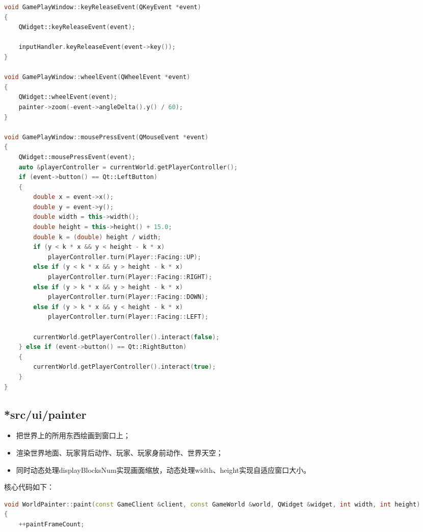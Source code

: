 \documentclass[a4paper,12pt]{report}
\begin{document}
\begin{spacing}{1.5}
\begin{lstlisting}[language={C++}]
void GamePlayWindow::keyReleaseEvent(QKeyEvent *event)
{
    QWidget::keyReleaseEvent(event);

    inputHandler.keyReleaseEvent(event->key());
}

void GamePlayWindow::wheelEvent(QWheelEvent *event)
{
    QWidget::wheelEvent(event);
    painter->zoom(-event->angleDelta().y() / 60);
}

void GamePlayWindow::mousePressEvent(QMouseEvent *event)
{
    QWidget::mousePressEvent(event);
    auto &playerController = currentWorld.getPlayerController();
    if (event->button() == Qt::LeftButton)
    {
        double x = event->x();
        double y = event->y();
        double width = this->width();
        double height = this->height() + 15.0;
        double k = (double) height / width;
        if (y < k * x && y < height - k * x)
            playerController.turn(Player::Facing::UP);
        else if (y < k * x && y > height - k * x)
            playerController.turn(Player::Facing::RIGHT);
        else if (y > k * x && y > height - k * x)
            playerController.turn(Player::Facing::DOWN);
        else if (y > k * x && y < height - k * x)
            playerController.turn(Player::Facing::LEFT);

        currentWorld.getPlayerController().interact(false);
    } else if (event->button() == Qt::RightButton)
    {
        currentWorld.getPlayerController().interact(true);
    }
}
\end{lstlisting}
\subsection{\textbf{*src/ui/painter}}
\begin{itemize}
    \item 把世界上的所用东西绘画到窗口上；
    \item 渲染世界地面、玩家背后动作、玩家、玩家身前动作、世界天空；
    \item 同时动态处理displayBlocksNum实现画面缩放，动态处理width、height实现自适应窗口大小。
\end{itemize}
核心代码如下：
\begin{lstlisting}[language={C++}]
void WorldPainter::paint(const GameClient &client, const GameWorld &world, QWidget &widget, int width, int height)
{
    ++paintFrameCount;


\end{lstlisting}
\end{spacing}
\end{document}
